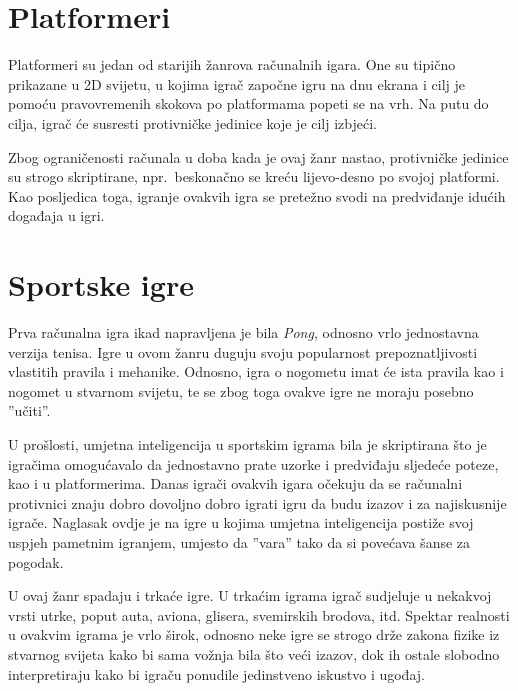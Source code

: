 \documentclass[times, utf8, zavrsni, numeric]{fer}
\begin{document}
\section{Platformeri}

\par Platformeri su jedan od starijih žanrova računalnih igara.
One su tipično prikazane u 2D svijetu, u kojima igrač započne igru na dnu ekrana i cilj je pomoću pravovremenih skokova po platformama popeti se na vrh.
Na putu do cilja, igrač će susresti protivničke jedinice koje je cilj izbjeći.

\par Zbog ograničenosti računala u doba kada je ovaj žanr nastao, protivničke jedinice su strogo skriptirane, npr.\ beskonačno se kreću lijevo-desno po svojoj platformi.
Kao posljedica toga, igranje ovakvih igra se pretežno svodi na predviđanje idućih događaja u igri.

\section{Sportske igre}

\par Prva računalna igra ikad napravljena je bila \textit{Pong}, odnosno vrlo jednostavna verzija tenisa.
Igre u ovom žanru duguju svoju popularnost prepoznatljivosti vlastitih pravila i mehanike.
Odnosno, igra o nogometu imat će ista pravila kao i nogomet u stvarnom svijetu, te se zbog toga ovakve igre ne moraju posebno ''učiti''.

\par U prošlosti, umjetna inteligencija u sportskim igrama bila je skriptirana što je igračima omogućavalo da jednostavno prate uzorke i predviđaju sljedeće poteze, kao i u platformerima.
Danas igrači ovakvih igara očekuju da se računalni protivnici znaju dobro dovoljno dobro igrati igru da budu izazov i za najiskusnije igrače.
Naglasak ovdje je na igre u kojima umjetna inteligencija postiže svoj uspjeh pametnim igranjem, umjesto da ''vara'' tako da si povećava šanse za pogodak.

\par U ovaj žanr spadaju i trkaće igre.
U trkaćim igrama igrač sudjeluje u nekakvoj vrsti utrke, poput auta, aviona, glisera, svemirskih brodova, itd.
Spektar realnosti u ovakvim igrama je vrlo širok, odnosno neke igre se strogo drže zakona fizike iz stvarnog svijeta kako bi sama vožnja bila što veći izazov, dok ih ostale slobodno interpretiraju kako bi igraču ponudile jedinstveno iskustvo i ugođaj.
\end{document}
